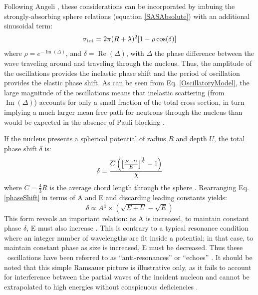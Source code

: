Following Angeli \cite{Angeli1970}, these considerations can be incorporated by
imbuing the strongly-absorbing sphere relations (equation \ref{SASAbsolute}) with an additional sinusoidal term:
\begin{equation} \label{OscillatoryModel}
    \tot = 2\pi (R+\lambdabar)^{2}[1 - \rho \cos(\delta)]
\end{equation}
where $\rho = e^{-\operatorname{Im}(\Delta)}$, and $\delta =
\operatorname{Re}(\Delta)$, with $\Delta$ the phase difference between the wave traveling
around and traveling through the nucleus. Thus, the amplitude of the oscillations provides the 
inelastic phase shift and the period of oscillation provides the elastic phase shift.
As can be seen from Eq. \ref{OscillatoryModel}, the large magnitude of the oscillations means that 
inelastic scattering (from $\operatorname{Im}(\Delta)$) accounts for only a small fraction of the 
total cross section, in turn implying a much larger mean free path for neutrons through the nucleus 
than would be expected in the absence of Pauli blocking \cite{Mohr1955}.

If the nucleus presents a spherical potential of radius $R$ and depth $U$, the total phase shift $\delta$ is:
\begin{equation} \label{phaseShift}
    \delta =
    \frac{\overline{C}\left(\left[{\frac{E+U}{E}}\right]^{\frac{1}{2}}-1\right)}{\lambdabar}
\end{equation}
where $\overline{C} = \frac{4}{3}R$ is the average chord length through the
sphere \cite{Angeli1970}. Rearranging Eq. \ref{phaseShift} in terms of A and E and
discarding leading constants yields:
\begin{equation}
    \delta \propto A^{\frac{1}{3}}\times\left(\sqrt{E+U}-\sqrt{E}\right)
\end{equation}
This form reveals an important relation: as A is increased, to maintain constant 
phase $\delta$, E must also increase \cite{Satchler1980, Peterson1962}. 
This is contrary to a typical resonance condition where an integer number of wavelengths
are fit inside a potential; in that case, to maintain constant phase as size is increased,
E must be decreased. Thus these \tot\ oscillations have been referred to as
``anti-resonances'' or ``echoes'' \cite{Satchler1980, McVoy1967}. It should be
noted that this simple Ramsauer picture is illustrative only, as it fails to
account for interference between the partial waves of the incident nucleon and
cannot be extrapolated to high energies without conspicuous deficiencies
\cite{Ahmad1973}.

